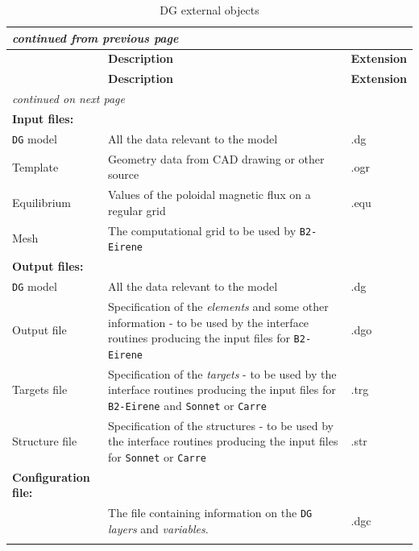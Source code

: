 \documentclass[a4paper,10pt]{report}
\begin{document}
\begin{center}
    \begin{longtable}{|l|p{10cm}|l|}
    \hline
    \multicolumn{3}{|l|}{\small\sl continued from previous page} \\
    \hline          & {\large\bf Description} & {\large\bf Extension} \\
    \hline \endhead
    \hline          & {\large\bf Description} & {\large\bf Extension} \\
    \hline \endfirsthead
    \hline
    \multicolumn{3}{|l|}{\small\sl continued on next page} \\
    \hline \endfoot
    \endlastfoot
{\bf Input files:}&                                      &           \\ \hline
{\tt DG} model     & All the data relevant to the model   & .dg \\
Template     & Geometry data from CAD drawing or other source
                                                    & .ogr \\
Equilibrium  & Values of the poloidal magnetic flux on a regular grid
                                                    & .equ \\
Mesh         & The computational grid to be used by {\tt B2-Eirene}
                                                    & \\ \hline
{\bf Output files:}&                                      & \\ \hline
{\tt DG} model     & All the data relevant to the model   & .dg \\
Output file  & Specification of the {\it elements} and some other
information - to be used by the interface routines producing
the input files for {\tt B2-Eirene}                & .dgo \\
Targets file & Specification of the {\it targets} - to be used by the
interface routines producing the input files for {\tt B2-Eirene} and {\tt Sonnet} or {\tt Carre}
                                                    & .trg \\
Structure file&Specification of the structures - to be used
by the interface routines producing the input files for {\tt Sonnet} or {\tt Carre}
                                                    & .str \\ \hline

{\bf Configuration file:}&                                & \\ \hline
              & The file containing information on the {\tt DG} {\it layers} and
{\it variables}.
                                                    & .dgc \\
    \hline
    \caption{DG external objects}
    \label{tab:dgexternalobjects}
  \end{longtable}
\end{center}
\end{document}
